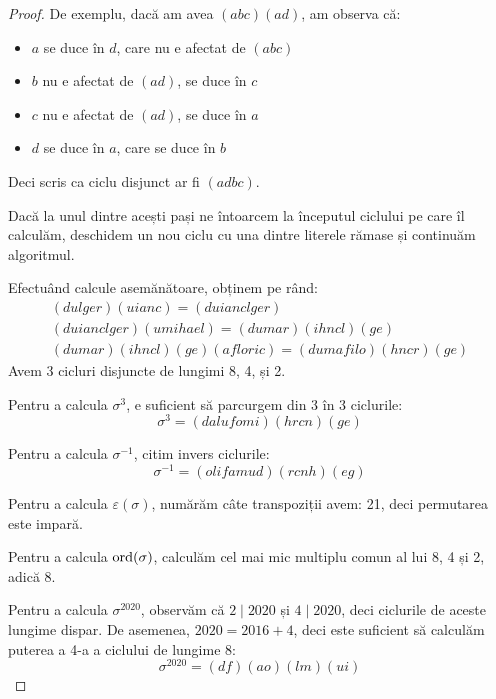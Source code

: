 \begin{enumerate}
\begin{enumerate}
\begin{proof}
    De exemplu, dacă am avea \((a b c)(a d)\), am observa că:
    \begin{itemize}
        \item \(a\) se duce în \(d\), care nu e afectat de \((a b c)\)
        \item \(b\) nu e afectat de \((a d)\), se duce în \(c\)
        \item \(c\) nu e afectat de \((a d)\), se duce în \(a\)
        \item \(d\) se duce în \(a\), care se duce în \(b\)
    \end{itemize}
    Deci scris ca ciclu disjunct ar fi \((a d b c)\).

    Dacă la unul dintre acești pași ne întoarcem la începutul ciclului pe care îl calculăm, deschidem un nou ciclu cu una dintre literele rămase și continuăm algoritmul.

    Efectuând calcule asemănătoare, obținem pe rând:
    \begin{gather*}
        (dulger)(uianc) = (duianclger) \\
        (duianclger)(umihael) = (dumar)(ihncl)(ge) \\
        (dumar)(ihncl)(ge)(afloric) = (dumafilo)(hncr)(ge)
    \end{gather*}
    Avem 3 cicluri disjuncte de lungimi 8, 4, și 2.

    Pentru a calcula \(\sigma^3\), e suficient să parcurgem din 3 în 3 ciclurile:
    \[\sigma^3 = (dalufomi) (hrcn) (ge)\]

    Pentru a calcula \(\sigma^{-1}\), citim invers ciclurile:
    \[\sigma^{-1} = (olifamud) (rcnh) (eg)\]

    Pentru a calcula \(\varepsilon(\sigma)\), numărăm câte transpoziții avem: 21, deci permutarea este impară.

    Pentru a calcula \(\operatorname{ord}(\sigma)\), calculăm cel mai mic multiplu comun al lui 8, 4 și 2, adică 8.

    Pentru a calcula \(\sigma^{2020}\), observăm că \(2 \mid 2020\) și \(4 \mid 2020\), deci ciclurile de aceste lungime dispar. De asemenea, \(2020 = 2016 + 4\), deci este suficient să calculăm puterea a 4-a a ciclului de lungime 8:
    \[\sigma^{2020} = (df)(ao)(lm)(ui)\]
    \end{proof}
\end{enumerate}
\end{enumerate}
